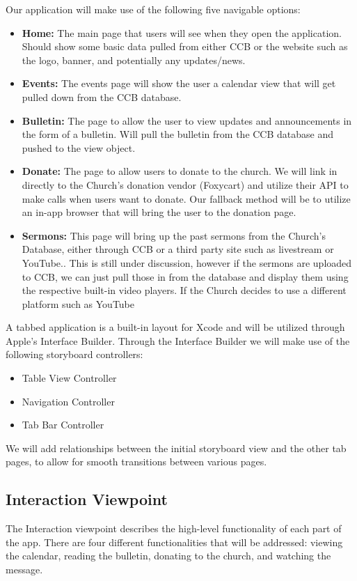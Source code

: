 \documentclass[letterpaper,10pt,draftclsnofoot,onecolumn,titlepage]{IEEEtran}
\begin{document}
			Our application will make use of the following five navigable options:
			\begin{itemize}
				\item \textbf{Home:} The main page that users will see when they open the application. Should show some basic data pulled from either CCB or the website such as the logo, banner, and potentially any updates/news.
				\item \textbf{Events:} The events page will show the user a calendar view that will get pulled down from the CCB database.
				\item \textbf{Bulletin:} The page to allow the user to view updates and announcements in the form of a bulletin. Will pull the bulletin from the CCB database and pushed to the view object.
				\item \textbf{Donate:} The page to allow users to donate to the church. We will link in directly to the Church's donation vendor (Foxycart) and utilize their API to make calls when users want to donate.
					Our fallback method will be to utilize an in-app browser that will bring the user to the donation page.
				\item \textbf{Sermons:} This page will bring up the past sermons from the Church's Database, either through CCB or a third party site such as livestream or YouTube..
					This is still under discussion, however if the sermons are uploaded to CCB, we can just pull those in from the database and display them using the respective built-in video players.
					If the Church decides to use a different platform such as YouTube
			\end{itemize}

			A tabbed application is a built-in layout for Xcode and will be utilized through Apple's Interface Builder.
			Through the Interface Builder we will make use of the following storyboard controllers:
			\begin{itemize}
				\item Table View Controller
				\item Navigation Controller
				\item Tab Bar Controller
			\end{itemize}
			We will add relationships between the initial storyboard view and the other tab pages, to allow for smooth transitions between various pages.



		\subsection{Interaction Viewpoint}
			The Interaction viewpoint describes the high-level functionality of each part of the app.
			There are four different functionalities that will be addressed: viewing the calendar, reading the bulletin, donating to the church, and watching the message.
\end{document}

